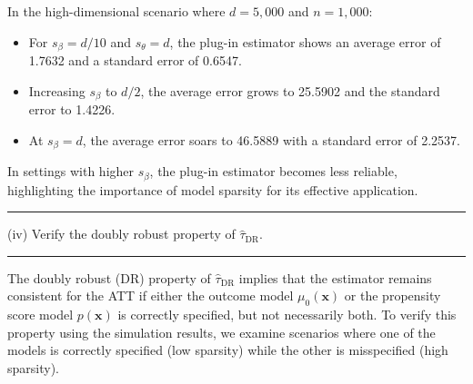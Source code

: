 \documentclass{article}
\newenvironment{colorparagraph}[1]{\par\color{#1}}{\par}
\begin{document}
In the high-dimensional scenario where \( d = 5,000 \) and \( n = 1,000 \):
\begin{itemize}
  \item For \( s_\beta = d/10 \) and \( s_\theta = d \), the plug-in estimator shows an average error of 1.7632 and a standard error of 0.6547.
  \item Increasing \( s_\beta \) to \( d/2 \), the average error grows to 25.5902 and the standard error to 1.4226.
  \item At \( s_\beta = d \), the average error soars to 46.5889 with a standard error of 2.2537.
\end{itemize}

In settings with higher \( s_\beta \), the plug-in estimator becomes less reliable, highlighting the importance of model sparsity for its effective application.

\begin{colorparagraph}{questioncolor}
  \rule{\textwidth}{0.5pt}
  
  \vspace{.2cm}
(iv) Verify the doubly robust property of \( \hat{\tau}_{\text{DR}} \).

\rule{\textwidth}{0.5pt}
\end{colorparagraph}

The doubly robust (DR) property of \( \hat{\tau}_{\text{DR}} \) implies that the estimator remains consistent for the ATT if either the outcome model \( \mu_0(\mathbf{x}) \) or the propensity score model \( p(\mathbf{x}) \) is correctly specified, but not necessarily both. To verify this property using the simulation results, we examine scenarios where one of the models is correctly specified (low sparsity) while the other is misspecified (high sparsity).
\end{document}
